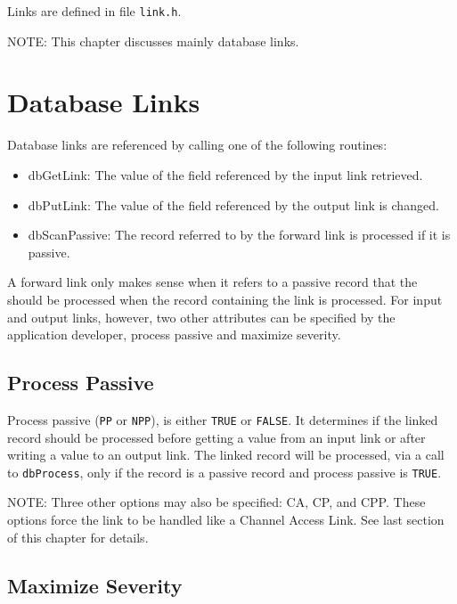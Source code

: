 Links are defined in file \verb|link.h|.

NOTE: This chapter discusses mainly database links.

\section{Database Links}

Database links are referenced by calling one of the following routines:

\begin{itemize}
\item {}dbGetLink: The value of the field referenced by the input link retrieved.

\item {}dbPutLink: The value of the field referenced by the output link is changed.

\item {}dbScanPassive: The record referred to by the forward link is processed if it is passive.

\end{itemize}

A forward link only makes sense when it refers to a passive record that the should be processed when the record 
containing the link is processed. For input and output links, however, two other attributes can be specified by the 
application developer, process passive and maximize severity.

\subsection{Process Passive}

Process passive (\verb|PP| or \verb|NPP|), is either \verb|TRUE| or \verb|FALSE|.  It determines if the linked record should be processed before 
getting a value from an input link or after writing a value to an output link. The linked record will be processed, via a call 
to \verb|dbProcess|, only if the record is a passive record and process passive is \verb|TRUE|.

NOTE: Three other options may also be specified: CA, CP, and CPP. These options force the link to be handled like a 
Channel Access Link. See last section of this chapter for details.

\subsection{Maximize Severity}

